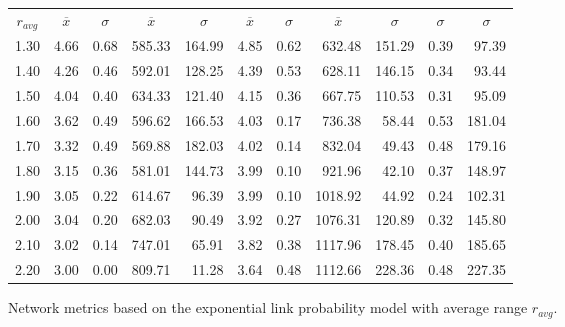 \documentclass{article}
\begin{document}
\begin{figure}[h]
\begin{center}
\begin{tabular}{|r|rr|rr|rr|rr|rr|}
\hline
\multicolumn{1}{|c|}{$r_{avg}$} & \multicolumn{1}{|c}{$\overline{x}$} & \multicolumn{1}{c|}{$\sigma$} & \multicolumn{1}{|c}{$\overline{x}$} & \multicolumn{1}{c|}{$\sigma$} & \multicolumn{1}{|c}{$\overline{x}$} & \multicolumn{1}{c|}{$\sigma$} & \multicolumn{1}{|c}{$\overline{x}$} & \multicolumn{1}{c|}{$\sigma$} & \multicolumn{1}{|c}{$\sigma$} & \multicolumn{1}{c|}{$\sigma$}\\
1.30 & 4.66 & 0.68 & 585.33 & 164.99 & 4.85 & 0.62 &  632.48 & 151.29 & 0.39 & 97.39\\
1.40 & 4.26 & 0.46 & 592.01 & 128.25 & 4.39 & 0.53 &  628.11 & 146.15 & 0.34 & 93.44\\
1.50 & 4.04 & 0.40 & 634.33 & 121.40 & 4.15 & 0.36 &  667.75 & 110.53 & 0.31 & 95.09\\
1.60 & 3.62 & 0.49 & 596.62 & 166.53 & 4.03 & 0.17 &  736.38 &  58.44 & 0.53 & 181.04\\
1.70 & 3.32 & 0.49 & 569.88 & 182.03 & 4.02 & 0.14 &  832.04 &  49.43 & 0.48 & 179.16\\
1.80 & 3.15 & 0.36 & 581.01 & 144.73 & 3.99 & 0.10 &  921.96 &  42.10 & 0.37 & 148.97\\
1.90 & 3.05 & 0.22 & 614.67 &  96.39 & 3.99 & 0.10 & 1018.92 &  44.92 & 0.24 & 102.31\\
2.00 & 3.04 & 0.20 & 682.03 &  90.49 & 3.92 & 0.27 & 1076.31 & 120.89 & 0.32 & 145.80\\
2.10 & 3.02 & 0.14 & 747.01 &  65.91 & 3.82 & 0.38 & 1117.96 & 178.45 & 0.40 & 185.65\\
2.20 & 3.00 & 0.00 & 809.71 &  11.28 & 3.64 & 0.48 & 1112.66 & 228.36 & 0.48 & 227.35\\
\hline
\end{tabular}
\caption{Network metrics based on the exponential link probability model with average range $r_{avg}$.}
\label{exp_exp}
\end{center}
\end{figure}
\end{document}
